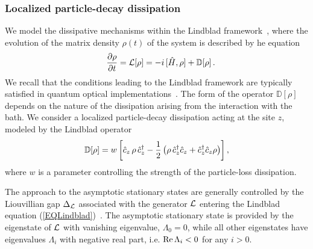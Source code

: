   
  
  \subsubsection{Localized particle-decay dissipation}
  \label{locdiss}
  
  We model the dissipative mechanisms within the Lindblad
  framework~\cite{Lindblad-76,GKS-76}, where the evolution of the matrix
  density $\rho(t)$ of the system is described by he
  equation~\cite{BP-book,RH-book}
  \begin{eqnarray}
  &&  {\partial\rho\over \partial t} = {\cal L}[\rho]=
    - i \, [ \hat H,\rho]
    + {\mathbb D}[\rho]\,.
    \label{EQLindblad}
  \end{eqnarray}
  We recall that the conditions leading to the Lindblad framework are
  typically satisfied in quantum optical
  implementations~\cite{SBD-16,DR-21}.  The form of the operator
  ${\mathbb D}[\rho]$ depends on the nature of the dissipation arising
  from the interaction with the bath.  We consider a localized
  particle-decay dissipation acting at the site $z$, modeled by the
  Lindblad operator~\cite{HC-13, KMSFR-17, Nigro-19, NRV-19, WSDK-20,
    FMKCD-20, DR-21,RV-21-rev}
  \begin{eqnarray}
  \mathbb{D}[\rho] = w\,\biggr[
      \hat c_{z}\,\rho\,\hat c_{z}^\dagger - {1\over 2}\left( \rho\,
      \hat c_z^\dagger \hat c_{z} + \hat c_z^\dagger \hat c_{z} \rho \right)
      \biggr] \,, 
  \label{Lindop}
  \end{eqnarray}
  where $w$ is a parameter controlling the strength of the particle-loss
  dissipation.
  
  
  
  The approach to the asymptotic stationary states are generally
  controlled by the Liouvillian gap $\Delta_{\cal L}$ associated with
  the generator ${\cal L}$ entering the Lindblad equation
  (\ref{EQLindblad})~\cite{BP-book,RH-book,Znidaric-15,MBBC-18,SK-20}.
  The asymptotic stationary state is provided by the eigenstate of
  ${\cal L}$ with vanishing eigenvalue, $\Lambda_0=0$, while all other
  eigenstates have eigenvalues $\Lambda_i$ with negative real part,
  i.e. ${\rm Re}\,\Lambda_i<0$ for any $i>0$.
  
